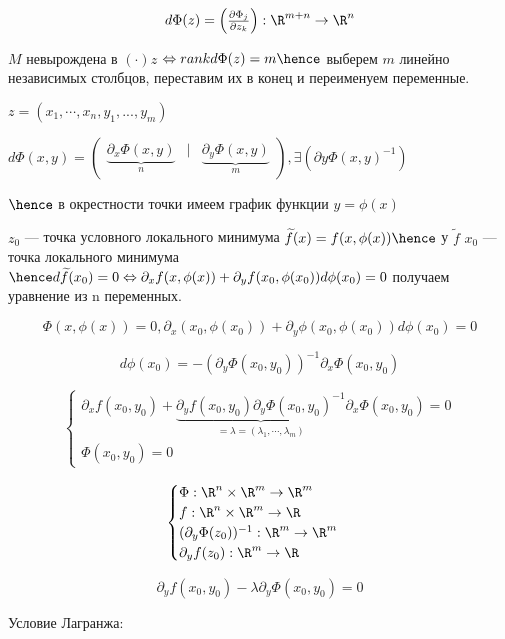 \[
    d\Phi(z) = 
    \begin{pmatrix}
        \frac{\partial \Phi_j}{\partial z_k}
    \end{pmatrix} : \R ^ {m + n} \to \R ^ n
\]


$M $ невырождена в $(\cdot) z$ $\Leftrightarrow rank{d \Phi(z)} = m \hence$ выберем $m$ линейно независимых столбцов, переставим их в конец и переименуем переменные.

$z = (x_1, \cdots, x_n, y_1, ..., y_m)$

$d \Phi(x, y) = \begin{pmatrix}
    \underbrace{\partial_x \Phi(x, y)}_{n} &\bigg | & \underbrace{\partial_y \Phi(x, y)}_{m} 
\end{pmatrix}, \exists (\partial y \Phi(x, y)^ {-1})$

$\hence $ в окрестности точки имеем график функции $y = \phi(x)$

$z_0$ --- точка условного локального минимума $\widetilde{f}(x) = f(x, \phi(x)) \hence$ у  $\widetilde{f}$ $x_0$ --- точка локального минимума $\hence d \widetilde{f} (x_0) = 0 \Leftrightarrow \partial_x f(x, \phi(x)) + \partial_y f(x_0, \phi(x_0)) d \phi(x_0) = 0$ получаем уравнение из n переменных.

\[
    \Phi(x, \phi(x)) = 0, \partial_x (x_0, \phi(x_0)) + \partial_y \phi(x_0, \phi(x_0)) d \phi(x_0) = 0
\]

\[
    d \phi(x_0) = - (\partial_y \Phi(x_0, y_0)) ^ {-1} \partial_x \Phi(x_0, y_0)
\]

\[
\begin{cases}
    \partial_x f(x_0, y_0) + \underbrace{\partial_y f(x_0, y_0) \partial_y \Phi(x_0, y_0)^{-1}}_{ = \lambda = (\lambda_1, \cdots, \lambda_m)} \partial_x \Phi(x_0, y_0) = 0\\

    \Phi(x_0, y_0) = 0
\end{cases}
\]

\[
    \begin{cases}
    \Phi : \R ^ n \times \R ^ m \to \R ^ m\\
    f : \R ^ n \times \R ^ m \to \R\\
   (\partial_y \Phi(z_0))^{-1} : \R^ m \to \R ^m\\
   \partial_y f(z_0) : \R^m \to \R
    \end{cases}
\]

\[
    \partial_y f(x_0, y_0) - \lambda \partial_y \Phi(x_0, y_0) = 0
\]

Условие Лагранжа: 

